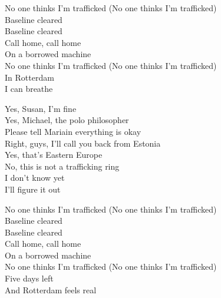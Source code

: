 \begin{lyrics}
No one thinks I’m trafficked
(No one thinks I’m trafficked)\\
Baseline cleared\\
Baseline cleared\\
Call home, call home\\
On a borrowed machine\\
No one thinks I’m trafficked
(No one thinks I’m trafficked)\\
In Rotterdam\\
I can breathe

Yes, Susan, I’m fine\\
Yes, Michael, the polo philosopher\\
Please tell Mariain everything is okay\\
Right, guys, I’ll call you back from Estonia\\
Yes, that’s Eastern Europe\\
No, this is not a trafficking ring\\
I don’t know yet\\
I’ll figure it out

No one thinks I’m trafficked
(No one thinks I’m trafficked)\\
Baseline cleared\\
Baseline cleared\\
Call home, call home\\
On a borrowed machine\\
No one thinks I’m trafficked
(No one thinks I’m trafficked)\\
Five days left\\
And Rotterdam feels real
\end{lyrics}

